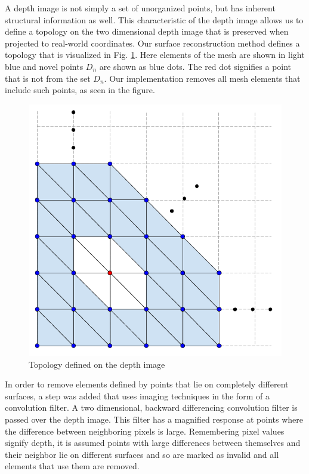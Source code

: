 A depth image is not simply a set of unorganized points, but has inherent
structural information as well. This characteristic of the depth image allows us
to define a topology on the two dimensional depth image that is preserved when
projected to real-world coordinates. Our surface reconstruction method defines a
topology that is visualized in Fig. \ref{fig:srm}. Here elements of the mesh
are shown in light blue and novel points $D_n$ are shown as blue dots. The red
dot signifies a point that is not from the set $D_n$. Our implementation removes
all mesh elements that include such points, as seen in the figure.

\begin{figure}[h]%
\centering
  \includegraphics[width=.70\textwidth]
    {figures/diagram_surface_reconstruction.png}
  \caption{Topology defined on the depth image}
  \label{fig:srm}
\end{figure}

In order to remove elements defined by points that lie on completely different
surfaces, a step was added that uses imaging techniques in the form of a
convolution filter. A two dimensional, backward differencing convolution filter
is passed over the depth image. This filter has a magnified response at points
where the difference between neighboring pixels is large. Remembering pixel
values signify depth, it is assumed points with large differences between
themselves and their neighbor lie on different surfaces and so are marked as
invalid and all elements that use them are removed.

